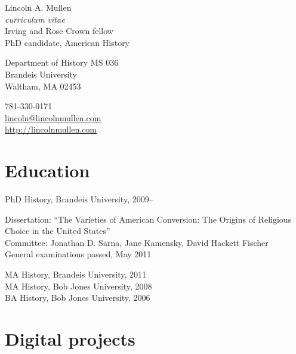 \documentclass[11pt]{article}
\begin{document}
{\LARGE Lincoln A. Mullen}\\
\emph{curriculum vitae}\\[0.5cm]

Irving and Rose Crown fellow\\
PhD candidate, American History

\begin{multicols}{2}
Department of History MS 036\\
Brandeis University\\
Waltham, MA 02453

\columnbreak

781-330-0171\\
\href{mailto:lincoln@lincolnmullen.com}{lincoln@lincolnmullen.com}\\
\href{http://lincolnmullen.com}{http://lincolnmullen.com}
\end{multicols}


\vskip 0.5cm


\section{Education}
PhD History, Brandeis University, 2009--

\begingroup
{}
Dissertation: ``The Varieties of American Conversion: The Origins of 
Religious Choice in the United States''\\[1pt]
Committee:  Jonathan D. Sarna, Jane Kamensky, David Hackett 
Fischer\\[1pt]
General examinations passed, May 2011
\par
\endgroup

MA History, Brandeis University, 2011\\
MA History, Bob Jones University, 2008\\
BA History, Bob Jones University, 2006




\section{Digital projects}
\end{document}
